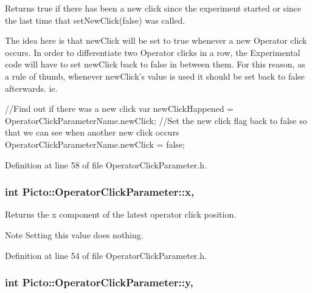 Returns true if there has been a new click since the experiment started or since the last time that set\-New\-Click(false) was called. 

The idea here is that new\-Click will be set to true whenever a new Operator click occurs. In order to differentiate two Operator clicks in a row, the Experimental code will have to set new\-Click back to false in between them. For this reason, as a rule of thumb, whenever new\-Click's value is used it should be set back to false afterwards. ie. 
\begin{DoxyCode}
\textcolor{comment}{//Find out if there was a new click}
var newClickHappened = OperatorClickParameterName.newClick;
\textcolor{comment}{//Set the new click flag back to false so that we can see when another new click occurs}
OperatorClickParameterName.newClick = \textcolor{keyword}{false};
\end{DoxyCode}
 

Definition at line 58 of file Operator\-Click\-Parameter.\-h.

\hypertarget{class_picto_1_1_operator_click_parameter_ae3ad1a093171b31403f106f5f2d5a6ce}{
\subsubsection[{x}]{\setlength{\rightskip}{0pt plus 5cm}int Picto\-::\-Operator\-Click\-Parameter\-::x\hspace{0.3cm}{\ttfamily [read]}, {\ttfamily [write]}}}\label{class_picto_1_1_operator_click_parameter_ae3ad1a093171b31403f106f5f2d5a6ce}


Returns the x component of the latest operator click position. 

\begin{DoxyNote}{Note}
Setting this value does nothing. 
\end{DoxyNote}


Definition at line 54 of file Operator\-Click\-Parameter.\-h.

\hypertarget{class_picto_1_1_operator_click_parameter_af9d7ea6a7c1ff91c8d151ca76baf3fc5}{
\subsubsection[{y}]{\setlength{\rightskip}{0pt plus 5cm}int Picto\-::\-Operator\-Click\-Parameter\-::y\hspace{0.3cm}{\ttfamily [read]}, {\ttfamily [write]}}}\label{class_picto_1_1_operator_click_parameter_af9d7ea6a7c1ff91c8d151ca76baf3fc5}


